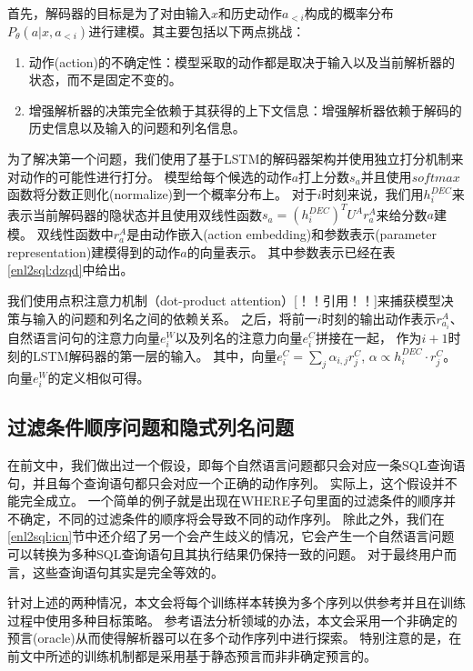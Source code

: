 首先，解码器的目标是为了对由输入$x$和历史动作$a_{<i}$构成的概率分布$P_{\theta}(a|x,a_{<i})$进行建模。其主要包括以下两点挑战：
\begin{enumerate}
  \item 动作(action)的不确定性：模型采取的动作都是取决于输入以及当前解析器的状态，而不是固定不变的。
  \item 增强解析器的决策完全依赖于其获得的上下文信息：增强解析器依赖于解码的历史信息以及输入的问题和列名信息。
\end{enumerate}

为了解决第一个问题，我们使用了基于LSTM的解码器架构并使用独立打分机制来对动作的可能性进行打分。
模型给每个候选的动作$a$打上分数$s_a$并且使用$softmax$函数将分数正则化(normalize)到一个概率分布上。
对于$i$时刻来说，我们用$h^{DEC}_i$来表示当前解码器的隐状态并且使用双线性函数$s_a = (h^{DEC}_i)^T U^A r^A_a$来给分数$a$建模。
双线性函数中$r^A_a$是由动作嵌入(action embedding)和参数表示(parameter representation)建模得到的动作$a$的向量表示。
其中参数表示已经在表\ref{enl2sql:dzqd}中给出。

我们使用点积注意力机制（dot-product attention）[！！引用！！]来捕获模型决策与输入的问题和列名之间的依赖关系。
之后，将前一$i$时刻的输出动作表示$r^A_{a_i}$、自然语言问句的注意力向量$e^W_i$以及列名的注意力向量$e^C_i$拼接在一起，
作为$i+1$时刻的LSTM解码器的第一层的输入。
其中，向量$e^C_i = \sum_j \alpha_{i,j} r^C_j$,  $\alpha \propto h^{DEC}_i \cdot r^C_j$。
向量$e^W_i$的定义相似可得。



\subsection{过滤条件顺序问题和隐式列名问题}
\label{enl2sql:ndo}

在前文中，我们做出过一个假设，即每个自然语言问题都只会对应一条SQL查询语句，并且每个查询语句都只会对应一个正确的动作序列。
实际上，这个假设并不能完全成立。
一个简单的例子就是出现在WHERE子句里面的过滤条件的顺序并不确定，不同的过滤条件的顺序将会导致不同的动作序列。
除此之外，我们在\ref{enl2sql:icn}节中还介绍了另一个会产生歧义的情况，它会产生一个自然语言问题可以转换为多种SQL查询语句且其执行结果仍保持一致的问题。
对于最终用户而言，这些查询语句其实是完全等效的。

针对上述的两种情况，本文会将每个训练样本转换为多个序列以供参考并且在训练过程中使用多种目标策略。
参考语法分析领域的办法，本文会采用一个非确定的预言(oracle)从而使得解析器可以在多个动作序列中进行探索。
特别注意的是，在前文中所述的训练机制都是采用基于静态预言而非非确定预言的。

